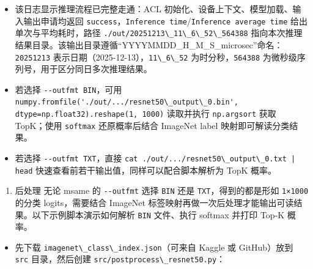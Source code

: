 \begin{itemize}
\tightlist
\item
  该日志显示推理流程已完整走通：ACL
  初始化、设备上下文、模型加载、输入输出申请均返回
  \passthrough{\lstinline!success!}，\passthrough{\lstinline!Inference time!}/\passthrough{\lstinline!Inference average time!}
  给出单次与平均耗时，路径
  \passthrough{\lstinline!./out/20251213\_11\_6\_52\_564388!}
  指向本次推理结果目录。该输出目录遵循``YYYYMMDD\_H\_M\_S\_microsec''命名：\passthrough{\lstinline!20251213!}
  表示日期（2025-12-13），\passthrough{\lstinline!11\_6\_52!}
  为时分秒，\passthrough{\lstinline!564388!}
  为微秒级序列号，用于区分同日多次推理结果。
\item
  若选择 \passthrough{\lstinline!--outfmt BIN!}，可用
  \passthrough{\lstinline!numpy.fromfile('./out/.../resnet50\_output\_0.bin', dtype=np.float32).reshape(1, 1000)!}
  读取并执行 \passthrough{\lstinline!np.argsort!} 获取 TopK；使用
  \passthrough{\lstinline!softmax!} 还原概率后结合 ImageNet label
  映射即可解读分类结果。
\item
  若选择 \passthrough{\lstinline!--outfmt TXT!}，直接
  \passthrough{\lstinline!cat ./out/.../resnet50\_output\_0.txt | head!}
  快速查看前若干输出值，同样可以配合脚本解析为 TopK 概率。
\end{itemize}

\begin{enumerate}
\def\labelenumi{\arabic{enumi}.}
\setcounter{enumi}{3}
\tightlist
\item
  后处理 无论 msame 的 \passthrough{\lstinline!--outfmt!} 选择
  \passthrough{\lstinline!BIN!} 还是
  \passthrough{\lstinline!TXT!}，得到的都是形如
  \passthrough{\lstinline!1×1000!} 的分类 logits，需要结合 ImageNet
  标签映射再做一次后处理才能输出可读结果。以下示例脚本演示如何解析
  \passthrough{\lstinline!BIN!} 文件、执行 softmax 并打印 Top-K 概率。
\end{enumerate}

\begin{itemize}
\tightlist
\item
  先下载 \passthrough{\lstinline!imagenet\_class\_index.json!}（可来自
  Kaggle 或 GitHub）放到 \passthrough{\lstinline!src!} 目录，然后创建
  \passthrough{\lstinline!src/postprocess\_resnet50.py!}：
\end{itemize}

